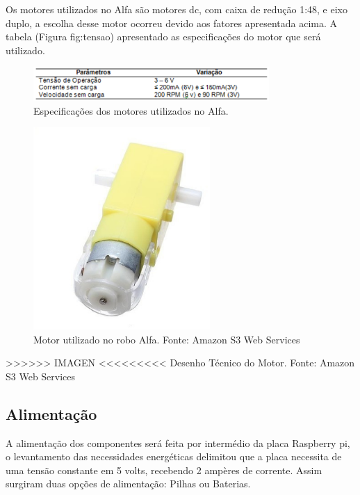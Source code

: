 Os motores utilizados no Alfa são motores dc, com caixa de redução 1:48, e eixo duplo, a escolha desse motor ocorreu devido aos
fatores apresentada acima. A tabela (Figura fig:tensao) apresentado as especificações do motor que será utilizado.

\begin{figure}[H]
    \centering
    \includegraphics[width=0.8\textwidth]{figuras/tensao.eps}
    \caption{Especificações dos motores utilizados no Alfa.}
    \label{fig:tensao}
\end{figure}

\begin{figure}[H]
    \centering
    \includegraphics[width=0.6\textwidth]{figuras/motor.eps}
    \caption{Motor utilizado no robo Alfa. Fonte: Amazon S3 Web Services}
    \label{fig:motor}
\end{figure}

>>>>>> IMAGEN <<<<<<<<<
Desenho Técnico do Motor. Fonte: Amazon S3 Web Services

\subsection{Alimentação}

A alimentação dos componentes será feita por intermédio da placa Raspberry pi, o levantamento das necessidades energéticas delimitou
que a placa necessita de uma tensão constante em 5 volts, recebendo 2 ampères de corrente.  Assim surgiram duas opções de
alimentação: Pilhas ou Baterias.

